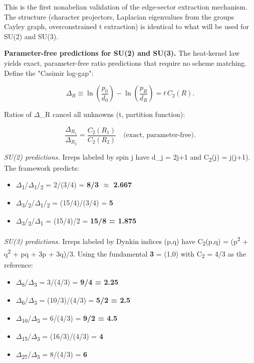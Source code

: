 This is the first nonabelian validation of the edge-sector extraction mechanism. The structure (character projectors, Laplacian eigenvalues from the group\textquotesingle s Cayley graph, overconstrained t extraction) is identical to what will be used for SU(2) and SU(3).

\textbf{Parameter-free predictions for SU(2) and SU(3).} The heat-kernel law yields exact, parameter-free ratio predictions that require no scheme matching. Define the "Casimir log-gap":

\[
\Delta_R \equiv \ln\left(\frac{p_0}{d_0}\right) - \ln\left(\frac{p_R}{d_R}\right)
= t \, C_2(R).
\]

Ratios of \ensuremath{\Delta}\_R cancel all unknowns (t, partition function):

\[
\frac{\Delta_{R_1}}{\Delta_{R_2}} = \frac{C_2(R_1)}{C_2(R_2)}
\quad \text{(exact, parameter-free).}
\]

\emph{SU(2) predictions.} Irreps labeled by spin j have d\_j = 2j+1 and C\textsubscript{2}(j) = j(j+1). The framework predicts:

\begin{itemize}
\tightlist
\item
  \ensuremath{\Delta}\textsubscript{1}/\ensuremath{\Delta}\textsubscript{1}/\textsubscript{2} = 2/(3/4) = \textbf{8/3 \ensuremath{\approx} 2.667}
\item
  \ensuremath{\Delta}\textsubscript{3}/\textsubscript{2}/\ensuremath{\Delta}\textsubscript{1}/\textsubscript{2} = (15/4)/(3/4) = \textbf{5}
\item
  \ensuremath{\Delta}\textsubscript{3}/\textsubscript{2}/\ensuremath{\Delta}\textsubscript{1} = (15/4)/2 = \textbf{15/8 = 1.875}
\end{itemize}

\emph{SU(3) predictions.} Irreps labeled by Dynkin indices (p,q) have C\textsubscript{2}(p,q) = (p\textsuperscript{2} + q\textsuperscript{2} + pq + 3p + 3q)/3. Using the fundamental \textbf{3} = (1,0) with C\textsubscript{2} = 4/3 as the reference:

\begin{itemize}
\tightlist
\item
  \ensuremath{\Delta}\textsubscript{8}/\ensuremath{\Delta}\textsubscript{3} = 3/(4/3) = \textbf{9/4 = 2.25}
\item
  \ensuremath{\Delta}\textsubscript{6}/\ensuremath{\Delta}\textsubscript{3} = (10/3)/(4/3) = \textbf{5/2 = 2.5}
\item
  \ensuremath{\Delta}\textsubscript{1}\textsubscript{0}/\ensuremath{\Delta}\textsubscript{3} = 6/(4/3) = \textbf{9/2 = 4.5}
\item
  \ensuremath{\Delta}\textsubscript{1}\textsubscript{5}/\ensuremath{\Delta}\textsubscript{3} = (16/3)/(4/3) = \textbf{4}
\item
  \ensuremath{\Delta}\textsubscript{2}\textsubscript{7}/\ensuremath{\Delta}\textsubscript{3} = 8/(4/3) = \textbf{6}
\end{itemize}

